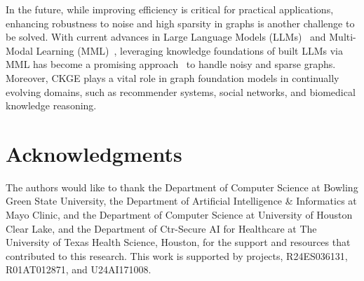 \documentclass[runningheads]{llncs}
\begin{document}
In the future, while improving efficiency is critical for practical applications, enhancing robustness to noise and high sparsity in graphs is another challenge to be solved. With current advances in Large Language Models (LLMs)~\cite{brown2020language,chowdhery2023palm,touvron2023llama} and Multi-Modal Learning (MML)~\cite{radford2021learning,jia2021scaling}, leveraging knowledge foundations of built LLMs via MML has become a promising approach~\cite{yasunaga2022linkbert,liu2023graphprompt} to handle noisy and sparse graphs. Moreover, CKGE plays a vital role in graph foundation models in continually evolving domains, such as recommender systems, social networks, and biomedical knowledge reasoning. 

\section{Acknowledgments}
The authors would like to thank the Department of Computer Science at Bowling Green State University, the Department of Artificial Intelligence \& Informatics at Mayo Clinic, and the Department of Computer Science at University of Houston Clear Lake, and the Department of Ctr-Secure AI for Healthcare at The University of Texas Health Science, Houston, for the support and resources that contributed to this research. This work is supported by projects, R24ES036131, R01AT012871, and U24AI171008.



\end{document}
